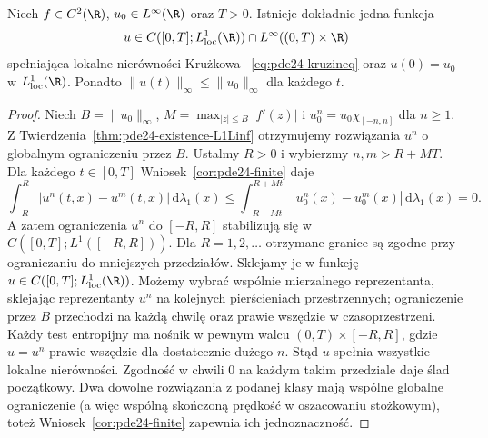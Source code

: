 \begin{twierdzenie}
\label{thm:pde24-existence-Linf}
Niech $f\in C^2(\R)$, $u_0\in L^\infty(\R)$ oraz $T>0$.
Istnieje dokładnie jedna funkcja
\[
 u\in C([0,T];L^1_{\mathrm{loc}}(\R))
 \cap L^\infty((0,T)\times\R)
\]
spełniająca lokalne nierówności Krużkowa
~\eqref{eq:pde24-kruzineq} oraz $u(0)=u_0$
w $L^1_{\mathrm{loc}}(\R)$. Ponadto
$\|u(t)\|_\infty\le\|u_0\|_\infty$ dla każdego $t$.
\end{twierdzenie}
\begin{proof}
Niech $B=\|u_0\|_\infty$,
$M=\max_{|z|\le B}|f'(z)|$ i
$u_0^n=u_0\chi_{[-n,n]}$ dla $n\ge1$.
Z Twierdzenia~\ref{thm:pde24-existence-L1Linf}
otrzymujemy rozwiązania $u^n$ o globalnym
ograniczeniu przez $B$.
Ustalmy $R>0$ i wybierzmy $n,m>R+MT$.
Dla każdego $t\in[0,T]$ Wniosek~\ref{cor:pde24-finite}
daje
\[
 \int_{-R}^R |u^n(t,x)-u^m(t,x)|\,\mathrm d\lambda_1(x)
 \le\int_{-R-Mt}^{R+Mt}|u_0^n(x)-u_0^m(x)|
 \,\mathrm d\lambda_1(x)=0.
\]
A zatem ograniczenia $u^n$ do $[-R,R]$ stabilizują się
w $C([0,T];L^1([-R,R]))$. Dla $R=1,2,\ldots$
otrzymane granice są zgodne przy ograniczaniu
do mniejszych przedziałów. Sklejamy je w funkcję
$u\in C([0,T];L^1_{\mathrm{loc}}(\R))$.
Możemy wybrać wspólnie mierzalnego reprezentanta,
sklejając reprezentanty $u^n$ na kolejnych
pierścieniach przestrzennych; ograniczenie przez $B$
przechodzi na każdą chwilę oraz prawie wszędzie
w czasoprzestrzeni. Każdy test entropijny ma nośnik
w pewnym walcu $(0,T)\times[-R,R]$, gdzie $u=u^n$
prawie wszędzie dla dostatecznie dużego $n$.
Stąd $u$ spełnia wszystkie lokalne nierówności.
Zgodność w chwili $0$ na każdym takim przedziale
daje ślad początkowy. Dwa dowolne rozwiązania
z podanej klasy mają wspólne globalne ograniczenie
(a więc wspólną skończoną prędkość w oszacowaniu
stożkowym), toteż Wniosek~\ref{cor:pde24-finite}
zapewnia ich jednoznaczność.
\end{proof}

